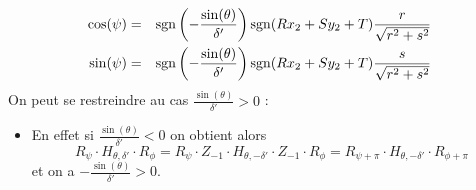  \begin{eqnarray*}
 \cos(\psi) &=& \operatorname{sgn}\left(-\frac{\sin(\theta)}{ \delta'}\right)\operatorname{sgn}(R x_2 + S y_2 +T)\frac{r}{\sqrt{r^{2}+s^{2}}}\\
 \sin(\psi) &=& \operatorname{sgn}\left(-\frac{\sin(\theta)}{ \delta'}\right)\operatorname{sgn}(R x_2 + S y_2 +T)\frac{s}{\sqrt{r^{2}+s^{2}}}
 \end{eqnarray*}
 On peut se restreindre au cas $\frac{\sin(\theta)}{\delta'}>0$ :\\
 \begin{itemize}
 \item En effet si $\frac{\sin(\theta)}{\delta'}<0$ on obtient alors
 \begin{equation*}
 R_{\psi} \cdot H_{\theta,\delta'} \cdot R_{\phi}=R_{\psi} \cdot Z_{-1}\cdot H_{\theta,-\delta'}\cdot Z_{-1} \cdot R_{\phi}= R_{\psi+\pi} \cdot H_{\theta,-\delta'}\cdot R_{\phi+\pi}
 \end{equation*}
 et on a $-\frac{\sin(\theta)}{\delta'}>0$.\\
 \end{itemize}


